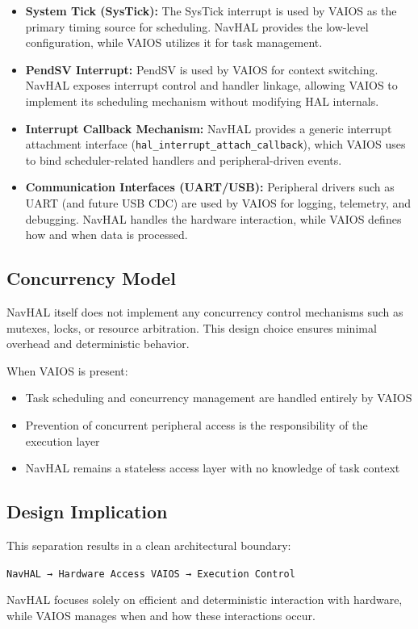 \begin{itemize}
    \item \textbf{System Tick (SysTick):}  
    The SysTick interrupt is used by VAIOS as the primary timing source for scheduling. NavHAL provides the low-level configuration, while VAIOS utilizes it for task management.

    \item \textbf{PendSV Interrupt:}  
    PendSV is used by VAIOS for context switching. NavHAL exposes interrupt control and handler linkage, allowing VAIOS to implement its scheduling mechanism without modifying HAL internals.

    \item \textbf{Interrupt Callback Mechanism:}  
    NavHAL provides a generic interrupt attachment interface (\texttt{hal\_interrupt\_attach\_callback}), which VAIOS uses to bind scheduler-related handlers and peripheral-driven events.

    \item \textbf{Communication Interfaces (UART/USB):}  
    Peripheral drivers such as UART (and future USB CDC) are used by VAIOS for logging, telemetry, and debugging. NavHAL handles the hardware interaction, while VAIOS defines how and when data is processed.
\end{itemize}

\subsection*{Concurrency Model}

NavHAL itself does not implement any concurrency control mechanisms such as mutexes, locks, or resource arbitration. This design choice ensures minimal overhead and deterministic behavior.

When VAIOS is present:

\begin{itemize}
    \item Task scheduling and concurrency management are handled entirely by VAIOS
    \item Prevention of concurrent peripheral access is the responsibility of the execution layer
    \item NavHAL remains a stateless access layer with no knowledge of task context
\end{itemize}

\subsection*{Design Implication}

This separation results in a clean architectural boundary:

\begin{center}
\texttt{NavHAL → Hardware Access \hspace{1cm} VAIOS → Execution Control}
\end{center}

NavHAL focuses solely on efficient and deterministic interaction with hardware, while VAIOS manages when and how these interactions occur.